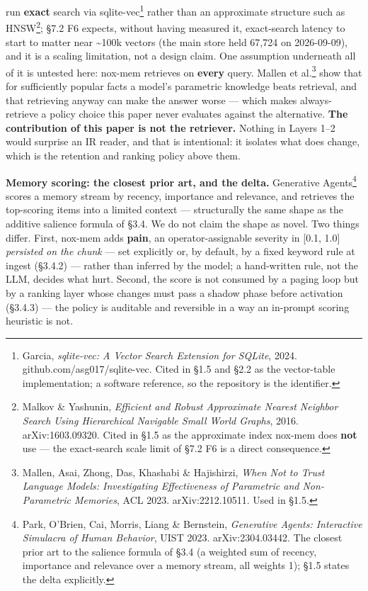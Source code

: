 \documentclass[
]{article}
\begin{document}
run \textbf{exact} search via sqlite-vec\footnote{Garcia,
  \emph{sqlite-vec: A Vector Search Extension for SQLite}, 2024.
  github.com/asg017/sqlite-vec. Cited in §1.5 and §2.2 as the
  vector-table implementation; a software reference, so the repository
  is the identifier.} rather than an approximate structure such as
HNSW\footnote{Malkov \& Yashunin, \emph{Efficient and Robust Approximate
  Nearest Neighbor Search Using Hierarchical Navigable Small World
  Graphs}, 2016. arXiv:1603.09320. Cited in §1.5 as the approximate
  index nox-mem does \textbf{not} use --- the exact-search scale limit
  of §7.2 F6 is a direct consequence.}; §7.2 F6 expects, without having
measured it, exact-search latency to start to matter near
\textasciitilde100k vectors (the main store held 67,724 on 2026-09-09),
and it is a scaling limitation, not a design claim. One assumption
underneath all of it is untested here: nox-mem retrieves on
\textbf{every} query. Mallen et al.\footnote{Mallen, Asai, Zhong, Das,
  Khashabi \& Hajishirzi, \emph{When Not to Trust Language Models:
  Investigating Effectiveness of Parametric and Non-Parametric
  Memories}, ACL 2023. arXiv:2212.10511. Used in §1.5.} show that for
sufficiently popular facts a model's parametric knowledge beats
retrieval, and that retrieving anyway can make the answer worse ---
which makes always-retrieve a policy choice this paper never evaluates
against the alternative. \textbf{The contribution of this paper is not
the retriever.} Nothing in Layers 1--2 would surprise an IR reader, and
that is intentional: it isolates what does change, which is the
retention and ranking policy above them.

\textbf{Memory scoring: the closest prior art, and the delta.}
Generative Agents\footnote{Park, O'Brien, Cai, Morris, Liang \&
  Bernstein, \emph{Generative Agents: Interactive Simulacra of Human
  Behavior}, UIST 2023. arXiv:2304.03442. The closest prior art to the
  salience formula of §3.4 (a weighted sum of recency, importance and
  relevance over a memory stream, all weights 1); §1.5 states the delta
  explicitly.} scores a memory stream by recency, importance and
relevance, and retrieves the top-scoring items into a limited context
--- structurally the same shape as the additive salience formula of
§3.4. We do not claim the shape as novel. Two things differ. First,
nox-mem adds \textbf{pain}, an operator-assignable severity in {[}0.1,
1.0{]} \emph{persisted on the chunk} --- set explicitly or, by default,
by a fixed keyword rule at ingest (§3.4.2) --- rather than inferred by
the model; a hand-written rule, not the LLM, decides what hurt. Second,
the score is not consumed by a paging loop but by a ranking layer whose
changes must pass a shadow phase before activation (§3.4.3) --- the
policy is auditable and reversible in a way an in-prompt scoring
heuristic is not.
\end{document}
